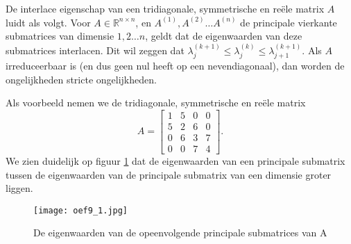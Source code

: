 De interlace eigenschap van een tridiagonale, symmetrische en re\"ele matrix $A$ luidt als volgt. Voor $A \in \mathbb{R}^{n \times n}$, en $A^{(1)}, A^{(2)}  \dots A^{(n)}$ de principale vierkante submatrices van dimensie $1, 2 \dots n$, geldt dat de eigenwaarden van deze submatrices interlacen. Dit wil zeggen dat $\lambda_j^{(k+1)} \leq \lambda_j^{(k)} \leq \lambda_{j+1}^{(k+1)}$. Als $A$ irreduceerbaar is (en dus geen nul heeft op een nevendiagonaal), dan worden de ongelijkheden stricte ongelijkheden.

Als voorbeeld nemen we de tridiagonale, symmetrische en re\"ele matrix
$$A = \begin{bmatrix} 
1 &5 &0 &0\\
5 &2 &6 &0 \\
0 &6 &3 &7\\
0 &0 &7 &4
\end{bmatrix}.$$
We zien duidelijk op figuur \ref{fig:oef9_1} dat de eigenwaarden van een principale submatrix tussen de eigenwaarden van de principale submatrix van een dimensie groter liggen.

\begin{figure}[H]
    \centering
    \texttt{[image: oef9\_1.jpg]}
    \caption{De eigenwaarden van de opeenvolgende principale submatrices van A}
    \label{fig:oef9_1}
\end{figure}